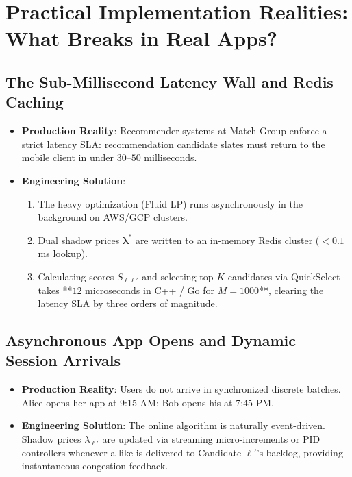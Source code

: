 \documentclass[11pt,letterpaper]{article}
\theoremstyle{definition}
\theoremstyle{plain}
\theoremstyle{remark}
\begin{document}
\newpage
\section{Practical Implementation Realities: What Breaks in Real Apps?}
\label{sec:realities}

\subsection{The Sub-Millisecond Latency Wall and Redis Caching}
\begin{itemize}[leftmargin=1.5em]
    \item \textbf{Production Reality}: Recommender systems at Match Group enforce a strict latency SLA: recommendation candidate slates must return to the mobile client in under $30\text{--}50$ milliseconds.
    \item \textbf{Engineering Solution}: 
    \begin{enumerate}[leftmargin=1.5em]
        \item The heavy optimization (Fluid LP) runs asynchronously in the background on AWS/GCP clusters.
        \item Dual shadow prices $\boldsymbol{\lambda}^*$ are written to an in-memory Redis cluster ($<0.1$ ms lookup).
        \item Calculating scores $S_{\ell\ell'}$ and selecting top $K$ candidates via QuickSelect takes **$12$ microseconds in C++ / Go for $M=1000$**, clearing the latency SLA by three orders of magnitude.
    \end{enumerate}
\end{itemize}

\subsection{Asynchronous App Opens and Dynamic Session Arrivals}
\begin{itemize}[leftmargin=1.5em]
    \item \textbf{Production Reality}: Users do not arrive in synchronized discrete batches. Alice opens her app at 9:15 AM; Bob opens his at 7:45 PM.
    \item \textbf{Engineering Solution}: The online algorithm is naturally event-driven. Shadow prices $\lambda_{\ell'}$ are updated via streaming micro-increments or PID controllers whenever a like is delivered to Candidate $\ell'$'s backlog, providing instantaneous congestion feedback.
\end{itemize}
\end{document}
